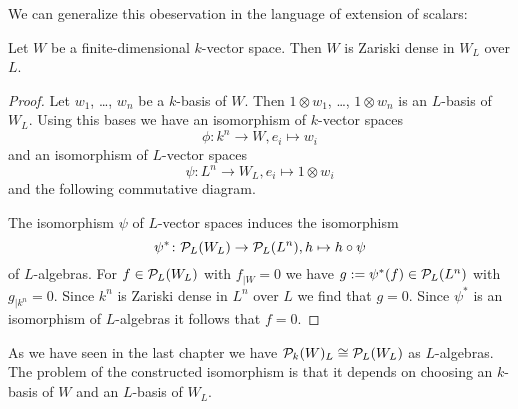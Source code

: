 We can generalize this obeservation in the language of extension of scalars:
\begin{lem}
 Let $W$ be a finite-dimensional $k$-vector space. Then $W$ is Zariski dense in $W_L$ over $L$.
\end{lem}
\begin{proof}
 Let $w_1$, \dots, $w_n$ be a $k$-basis of $W$. Then $1 \otimes w_1$, \dots, $1 \otimes w_n$ is an $L$-basis of $W_L$. Using this bases we have an isomorphism of $k$-vector spaces
 \[
  \phi \colon k^n \to W, e_i \mapsto w_i
 \]
 and an isomorphism of $L$-vector spaces
 \[
  \psi \colon L^n \to W_L, e_i \mapsto 1 \otimes w_i
 \]
 and the following commutative diagram.
 \begin{center}
 \end{center}
 The isomorphism $\psi$ of $L$-vector spaces induces the isomorphism
 \[
  \psi^* \colon \mathcal{P}_L(W_L) \to \mathcal{P}_L(L^n), h \mapsto h \circ \psi
 \]
 of $L$-algebras. For $f \in \mathcal{P}_L(W_L)$ with $f_{|W} = 0$ we have $g := \psi^*(f) \in \mathcal{P}_L(L^n)$ with $g_{|k^n} = 0$. Since $k^n$ is Zariski dense in $L^n$ over $L$ we find that $g = 0$. Since $\psi^*$ is an isomorphism of $L$-algebras it follows that $f = 0$.
\end{proof}


As we have seen in the last chapter we have $\mathcal{P}_k(W)_L \cong \mathcal{P}_L(W_L)$ as $L$-algebras. The problem of the constructed isomorphism is that it depends on choosing an $k$-basis of $W$ and an $L$-basis of $W_L$.


